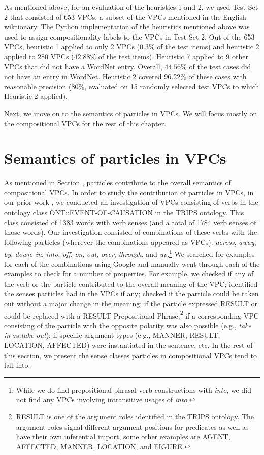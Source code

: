 \documentclass[output=paper
,modfonts
,nonflat]{langsci/langscibook}
\begin{document}
As mentioned above, for an evaluation of the heuristics 1 and 2, we used Test Set 2 that consisted of 653 VPCs, a subset of the VPCs mentioned in the English wiktionary. The Python implementation of the heuristics mentioned above was used to assign compositionality labels to the VPCs in Test Set 2. Out of the 653 VPCs, heuristic 1 applied to only 2 VPCs ($0.3\%$ of the test items) and heuristic 2 applied to 280 VPCs ($42.88\%$ of the test items). Heuristic 7 applied to 9 other VPCs that did not have a WordNet entry. Overall, $44.56\%$ of the test cases did not have an entry in WordNet.  Heuristic 2 covered $96.22\%$ of these cases with reasonable precision ($80\%$, evaluated on 15 randomly selected test VPCs to which Heuristic 2 applied).

Next, we move on to the semantics of particles in VPCs. We will focus mostly on the compositional VPCs for the rest of this chapter. 

\section{Semantics of particles in VPCs } \label{sec:prtcl-semcs}

As mentioned in Section , particles contribute to the overall semantics of compositional VPCs. In order to study the contribution of particles in VPCs, in our prior work \citep{Bha17}, we conducted an investigation of VPCs consisting of verbs in the ontology class ONT::EVENT-OF-CAUSATION in the TRIPS ontology. This class consisted of 1383 words with verb senses (and a total of 1784 verb senses of those words). Our investigation consisted of combinations of these verbs with the following particles (wherever the combinations %
appeared as VPCs): \textit{across}, \textit{away}, \textit{by}, \textit{down}, \textit{in}, \textit{into}, \textit{off}, \textit{on}, \textit{out}, \textit{over}, \textit{through}, and \textit{up}.\footnote{While we do find prepositional phrasal verb constructions with \textit{into}, we did not find any VPCs involving intransitive usages of \textit{into}.} We searched for examples for each of the combinations using Google and manually went through each of the examples to check for a number of properties. For example, we checked if any of the verb or the particle contributed to the overall meaning of the VPC; identified the senses particles had in the VPCs if any; checked if the particle could be taken out without a major change in the meaning; if the particle expressed RESULT or could be replaced with a RESULT-Prepositional Phrase;\footnote{RESULT is one of the argument roles identified in the TRIPS ontology. The argument roles signal different argument positions for predicates as well as have their own inferential import, some other examples are AGENT, AFFECTED, MANNER, LOCATION, and FIGURE.} if a corresponding VPC consisting of the particle with the opposite polarity was also possible (e.g., \textit{take in} vs.\textit{take out}); if specific argument types (e.g., MANNER, RESULT, LOCATION, AFFECTED) were instantiated in the sentence, etc. In the rest of this section, we present the sense classes particles in compositional VPCs tend to fall into. 
\end{document}
